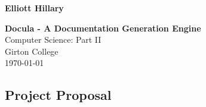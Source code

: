 \documentclass[twoside,12pt,notitlepage]{Classes/CUEDthesisPSnPDF}
\begin{document}
\pagestyle{empty}

\hfill{\LARGE \bf Elliott Hillary}

\vspace*{60mm}
\begin{center}
\Huge
{\bf Docula - A Documentation Generation Engine} \\
\vspace*{5mm}
Computer Science: Part II\\
\vspace*{5mm}
Girton College \\
\vspace*{5mm}
\today  %
\end{center}

\setcounter{secnumdepth}{3}
\setcounter{tocdepth}{3}

\frontmatter %
\cleardoublepage

\cleardoublepage


\tableofcontents

\mainmatter %
\pagestyle{fancy}






\printbibliography

\begin{appendices}

\chapter{Project Proposal}

\end{appendices}
\end{document}
